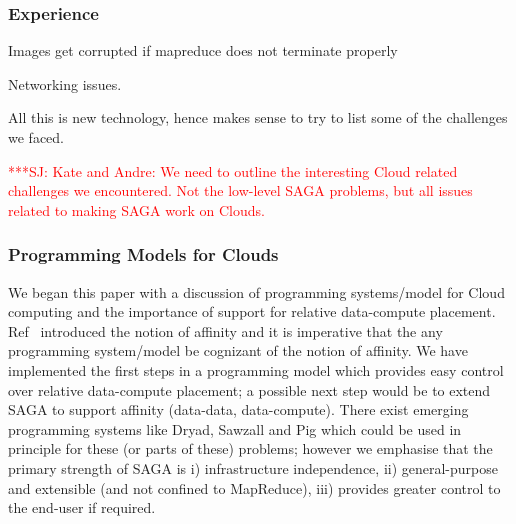 \documentclass[conference,final]{IEEEtran}
\newcommand{\jhanote}[1]{ {\textcolor{red} { ***SJ: #1 }}}
\newcommand{\jhanote}[1]{}
\newcommand{\sagamapreduce }{SAGA-MapReduce }
\begin{document}


\subsubsection*{Experience}

Images get corrupted if mapreduce does not terminate properly

Networking issues.

All this is new technology, hence makes sense to try to list some of
the challenges we faced.

\jhanote{Kate and Andre: We need to outline the interesting Cloud
related challenges we encountered.  Not the low-level SAGA problems,
but all issues related to making SAGA work on Clouds.  
}


\subsubsection*{Programming Models for Clouds}


We began this paper with a discussion of programming systems/model for
Cloud computing and the importance of support for relative
data-compute placement. Ref~\cite{jha_ccpe09} introduced the notion of
affinity and it is imperative that the any programming system/model be
cognizant of the notion of affinity. We have implemented the first
steps in a programming model which provides easy control over relative
data-compute placement; a possible next step would be to extend SAGA
to support affinity (data-data, data-compute).  There exist emerging
programming systems like Dryad, Sawzall and Pig which could be used in
principle for these (or parts of these) problems; however we emphasise
that the primary strength of SAGA is i) infrastructure independence,
ii) general-purpose and extensible (and not confined to MapReduce),
iii) provides greater control to the end-user if required.
\end{document}
